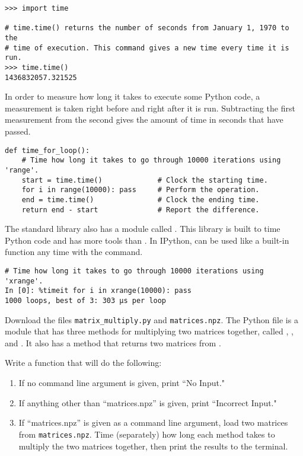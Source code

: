 \begin{lstlisting}
>>> import time

# time.time() returns the number of seconds from January 1, 1970 to the
# time of execution. This command gives a new time every time it is run.
>>> time.time()
1436832057.321525
\end{lstlisting}

In order to measure how long it takes to execute some Python code, a measurement is taken right before and right after it is run.
Subtracting the first measurement from the second gives the amount of time in seconds that have passed.

\begin{lstlisting}
def time_for_loop():
    # Time how long it takes to go through 10000 iterations using 'range'.
    start = time.time()             # Clock the starting time.
    for i in range(10000): pass     # Perform the operation.
    end = time.time()               # Clock the ending time.
    return end - start              # Report the difference.
\end{lstlisting}

The standard library also has a module called .
This library is built to time Python code and has more tools than 
.
In IPython,  can be used like a built-in function any time with the  command.

\begin{lstlisting}
# Time how long it takes to go through 10000 iterations using 'xrange'.
In [0]: %timeit for i in xrange(10000): pass 
1000 loops, best of 3: 303 µs per loop
\end{lstlisting}

\begin{problem}
Download the files \texttt{matrix\_multiply.py} and \texttt{matrices.npz}.
The Python file  is a module that has three methods for multiplying two matrices together, called , , and .
It also has a  method that returns two matrices from .

Write a function that will do the following:
\begin{enumerate}
\item If no command line argument is given, print ``No Input."
\item If anything other than ``matrices.npz'' is given, print ``Incorrect Input."
\item If ``matrices.npz'' is given as a command line argument, load two matrices from \texttt{matrices.npz}. Time (separately) how long each method takes to multiply the two matrices together, then print the results to the terminal.
\end{enumerate}
\end{problem}
